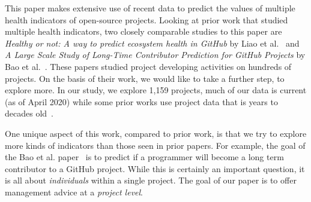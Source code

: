\documentclass[smallextended]{svjour3}
\newcommand{\BLUE}{\color{blue}}
\newcommand{\BLACK}{\color{black}}
\begin{document}

This paper makes extensive
use of recent data to predict the values of multiple health indicators of open-source projects.
\BLACK
Looking at prior work that studied multiple health indicators,
two closely  comparable studies to this paper are {\em Healthy or not: A way to predict ecosystem health in GitHub} by 
Liao et al.~\cite{liao2019healthy}
and{ \em A Large Scale Study of Long-Time Contributor Prediction for GitHub Projects} by
Bao et al.~\cite{bao2019large}.
These papers studied project developing activities on hundreds of projects. On the basis of their work, we would like to take a further step, to explore more. In our study, we explore 1,159 projects, much of our data is current (as of April 2020) while some prior works use project data that is years to decades old~\cite{sarro2016multi}.


One unique aspect of this work, compared to prior work, is that
we try to explore more kinds of indicators than those seen in prior papers.  For example, the goal of the Bao et al. paper~\cite{bao2019large} is to predict if  a programmer will become a long term  contributor to a GitHub project. While this is certainly   an important question, it is all about {\em individuals} within a single project. The goal of our paper is to offer management advice at a  {\em project level}.
\end{document}
